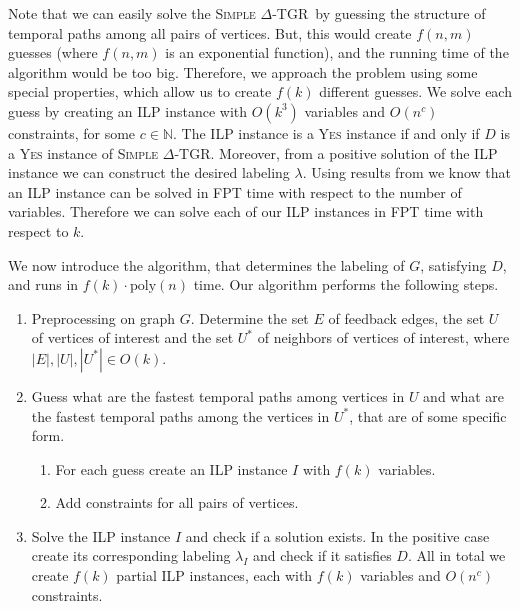 \documentclass[11pt,a4paper]{article}
\theoremstyle{remark}
\theoremstyle{definition}
\newcommand{\deltaExact}{\textsc{Simple $\Delta$-TGR}}
\begin{document}
Note that we can easily solve the \deltaExact\ by guessing the structure of temporal paths among all pairs of vertices.
But, this would create $f(n,m)$ guesses (where $f(n,m)$ is an exponential function), and the running time of the algorithm would be too big.
Therefore, we approach the problem using some special properties, which allow us to create $f(k)$ different guesses.
We solve each guess by creating an ILP instance with $O(k^3)$ variables and $O(n^c)$ constraints, for some $c \in \mathbb{N}$.
The ILP instance is a \textsc{Yes} instance if and only if $D$ is a \textsc{Yes} instance of \deltaExact.
Moreover, from a positive solution of the ILP instance we can construct the desired labeling $\lambda$.
Using results from \cite{Lenstra1983Integer} we know that an ILP instance can be solved in FPT time with respect to the number of variables.
Therefore we can solve each of our ILP instances in FPT time with respect to $k$.

We now introduce the algorithm, that determines the labeling of $G$, satisfying $D$, and runs in $f(k) \cdot \text{poly}(n)$ time.
Our algorithm performs the following steps.
\begin{enumerate}
    \item Preprocessing on graph $G$. Determine the set $E$ of feedback edges, the set $U$ of vertices of interest and the set $U^*$ of neighbors of vertices of interest, where $|E|, |U|, |U^*| \in O(k)$.
    \item Guess what are the fastest temporal paths among vertices in $U$ and 
    what are the fastest temporal paths among the vertices in $U^*$, that are of some specific form.
    \begin{enumerate}
        \item For each guess create an ILP instance $I$ with $f(k)$ variables.
        \item Add constraints for all pairs of vertices.
    \end{enumerate}
    \item Solve the ILP instance $I$ and check if a solution exists. In the positive case create its corresponding labeling $\lambda_I$ and check if it satisfies $D$.
    All in total we create $f(k)$ partial ILP instances, each with $f(k)$ variables and $O(n^c)$ constraints.
\end{enumerate}
\end{document}
